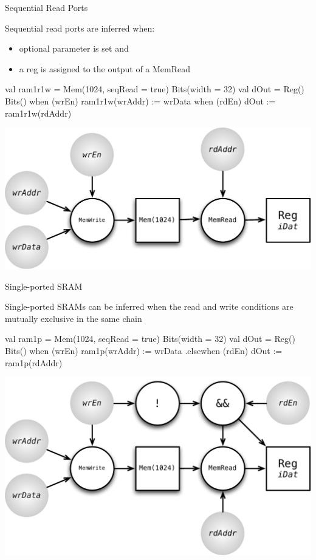 \documentclass[xcolor=pdflatex,dvipsnames,table]{beamer}
\begin{document}
\begin{frame}[fragile]{Sequential Read Ports}

Sequential read ports are inferred when:
\begin{itemize}
\item optional parameter  is set and
\item a reg is assigned to the output of a MemRead
\end{itemize}

\begin{scala}
val ram1r1w = Mem(1024, seqRead = true) { Bits(width = 32) }
val dOut    = Reg() { Bits() }
when (wrEn) { ram1r1w(wrAddr) := wrData }
when (rdEn) { dOut := ram1r1w(rdAddr) }
\end{scala}

\begin{center}
\includegraphics[height=0.4\textheight]{figs/mem-seq-read.pdf} 
\end{center}

\end{frame}

\begin{frame}[fragile]{Single-ported SRAM}

Single-ported SRAMs can be inferred when the read and write conditions are
mutually exclusive in the same  chain

\begin{scala}
val ram1p = Mem(1024, seqRead = true) { Bits(width = 32) }
val dOut  = Reg() { Bits() }
when (wrEn) { ram1p(wrAddr) := wrData }
.elsewhen (rdEn) { dOut := ram1p(rdAddr) }
\end{scala}

\begin{center}
\includegraphics[height=0.5\textheight]{figs/mem-single-ported.pdf} 
\end{center}

\end{frame}
\end{document}
